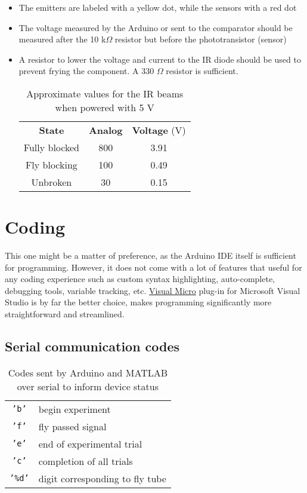 \documentclass[12pt]{article}
\begin{document}
\begin{itemize}
	\item The emitters are labeled with a yellow dot, while the sensors with a red dot
	\item The voltage measured by the Arduino or sent to the comparator should be measured after the 10 k$\Omega$ resistor but before the phototransistor (sensor)
	\item A resistor to lower the voltage and current to the IR diode should be used to prevent frying the component. A 330 $\Omega$ resistor is sufficient.
	\begin{table}[H]
		\centering
		\begin{tabular}{c | c | c}
			\textbf{State} 	& \textbf{Analog} & \textbf{Voltage} (V) \\ \cline{1-3}
			Fully blocked 	& 800  & 3.91\\
			Fly blocking	& 100  & 0.49\\
			Unbroken 		& 30   & 0.15\\ 
		\end{tabular}
		\caption{Approximate values for the IR beams when powered with 5 V}
		\label{tbl:irstates}
	\end{table}
\end{itemize}

\section{Coding}
This one might be a matter of preference, as the Arduino IDE itself is sufficient for programming. However, it does not come with a lot of features that useful for any coding experience such as custom syntax highlighting, auto-complete, debugging tools, variable tracking, etc. \href{https://www.visualmicro.com/}{Visual Micro} plug-in for Microsoft Visual Studio is by far the better choice, makes programming significantly more straightforward and streamlined.

\subsection{Serial communication codes}
\begin{table}[H]
	\centering
	\begin{tabular}{c l}
		\texttt{'b'}  & begin experiment\\
	    \texttt{'f'}  & fly passed signal\\
		\texttt{'e'}  & end of experimental trial\\
		\texttt{'c'}  & completion of all trials\\				
		\texttt{'\%d'} & digit corresponding to fly tube\\
	\end{tabular}
	\caption{Codes sent by Arduino and MATLAB over serial to inform device status}
	\label{tbl:arduino_codes}
\end{table}
\end{document}
